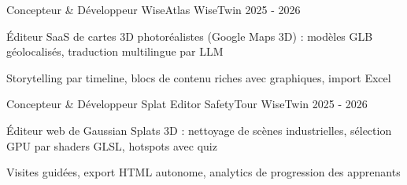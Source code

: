 


\begin{cventries}


\cventry
{Concepteur \& Développeur} %
{WiseAtlas} %
{WiseTwin} %
{2025 - 2026} %
{ %
\begin{cvitems}
\item {Éditeur SaaS de cartes 3D photoréalistes (Google Maps 3D) : modèles GLB géolocalisés, traduction multilingue par LLM}
\item {Storytelling par timeline, blocs de contenu riches avec graphiques, import Excel}
\end{cvitems}
}
\vspace{1em}


\cventry
{Concepteur \& Développeur} %
{Splat Editor SafetyTour} %
{WiseTwin} %
{2025 - 2026} %
{ %
\begin{cvitems}
\item {Éditeur web de Gaussian Splats 3D : nettoyage de scènes industrielles, sélection GPU par shaders GLSL, hotspots avec quiz}
\item {Visites guidées, export HTML autonome, analytics de progression des apprenants}
\end{cvitems}
}


\end{cventries}

